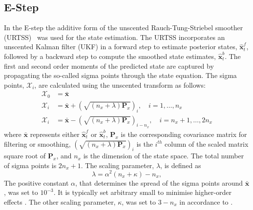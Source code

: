 \documentclass[]{article}
\begin{document}
\subsection{E-Step}
In the E-step the additive form of the unscented Rauch-Tung-Striebel smoother (URTSS)~\cite{Sarkka2010} was used for the state estimation. The URTSS incorporates an unscented Kalman filter (UKF) \cite{Julier1997, Merwe2003} in a forward step to estimate posterior states, $\hat{\mathbf x}_t^{f}$, followed by a backward step to compute the smoothed state estimates, $\hat{\mathbf x}_t^{b}$. The first and second order moments of the predicted state are captured by propagating the so-called sigma points through the state equation. The sigma points, $\mathcal X_i$, are calculated using the unscented transform as follows:
\begin{align}\label{eq:sigmapoints1}
	\mathcal X_{0}&=\mathbf{\bar x} \\
	\mathcal X_{i}&= \mathbf{\bar x}+\left(\sqrt{( n_x + \lambda)\mathbf P_x}\right)_i, \quad i=1, \dots, n_x \\
	\mathcal X_{i}&=\mathbf{\bar x}-\left(\sqrt{( n_x + \lambda)\mathbf P_x}\right)_{i- n_x}, \quad i= n_x+1, \dots, 2n_x 
\end{align}
where $\mathbf{\bar x}$ represents either $\hat{\mathbf x}_t^{f}$ or $\hat{\mathbf x}_t^{b}$, $\mathbf{P}_x$ is the corresponding covariance matrix for filtering or smoothing, $\left(\sqrt{( n_x + \lambda)\mathbf P_x}\right)_i$ is the $i^{th}$ column of the scaled matrix square root of $\mathbf P_x$, and $n_x$ is the dimension of the state space. The total number of sigma points is $2n_x+1$. The scaling parameter, $\lambda$, is defined as 
\begin{equation}\label{eq:sigmapoints3}
	\lambda=\alpha^2( n_x+\kappa) - n_x, 
\end{equation}
The positive constant $\alpha$, that determines the spread of the sigma points around $\mathbf{\bar x}$, was set to $10^{-3}$. It is typically set arbitrary small to minimise higher-order effects \cite{Haykin2001}. The other scaling parameter, $\kappa$, was set to $3-n_x$ in accordance to \cite{Julier2002a}.
\end{document}
